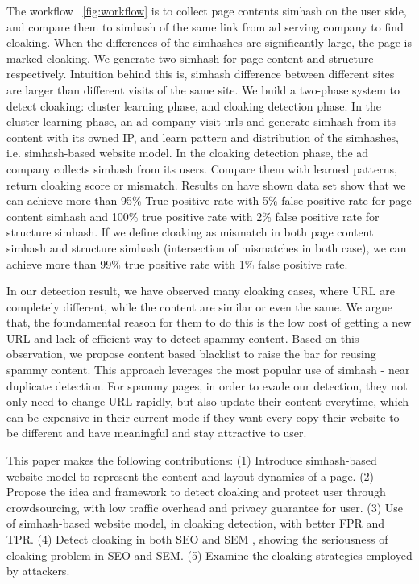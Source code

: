 The workflow ~\autoref{fig:workflow} is to collect page contents simhash on the user side, and compare
them to simhash of the same link from ad serving company to find cloaking. When
the differences of the simhashes are significantly large, the page is marked
cloaking. We generate two simhash for page content and structure respectively.
Intuition behind this is, simhash difference between different sites are larger
than different visits of the same site. We build a two-phase system to detect
cloaking: cluster learning phase, and cloaking detection phase. In the cluster
learning phase, an ad company visit urls and generate simhash from its content
with its owned IP, and learn pattern and distribution of the simhashes, i.e.
simhash-based website model. In the cloaking detection phase, the ad company
collects simhash from its users. Compare them with learned patterns, return
cloaking score or mismatch. Results on have shown data set show that we can
achieve more than 95\% True positive rate with 5\% false positive rate for page
content simhash and 100\% true positive rate with 2\% false positive rate for
structure simhash. If we define cloaking as mismatch in both page content
simhash and structure simhash (intersection of mismatches in both case), we can
achieve more than 99\% true positive rate with 1\% false positive rate.


In our detection result, we have observed many cloaking cases, where URL are
completely different, while the content are similar or even the same.
We argue that, the foundamental reason for them to do this is the low cost of
getting a new URL and lack of efficient way to detect spammy content.
Based on this observation, we propose content based blacklist to raise the bar
for reusing spammy content. This approach leverages the most popular use of
simhash - near duplicate detection. For spammy pages, in order to evade our
detection, they not only need to change URL rapidly, but also update their
content everytime, which can be expensive in their current mode if they want
every copy their website to be different and have meaningful and stay attractive
to user.


This paper makes the following contributions:
(1) Introduce simhash-based website model to represent the content and layout
dynamics of a page.
(2) Propose the idea and framework to detect cloaking and protect user through crowdsourcing,
with low traffic overhead and privacy guarantee for user.
(3) Use of simhash-based website model, in cloaking detection, with better FPR
and TPR.
(4) Detect cloaking in both SEO and SEM , showing the seriousness of cloaking
problem in SEO and SEM.
(5) Examine the cloaking strategies employed by attackers.


